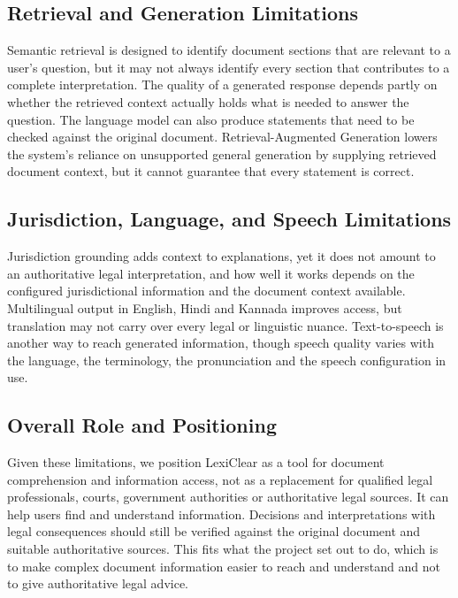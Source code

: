 \documentclass[12pt,a4paper,oneside]{report}
\begin{document}
\subsection{Retrieval and Generation Limitations}

Semantic retrieval is designed to identify document sections that are
relevant to a user's question, but it may not always identify every section
that contributes to a complete interpretation. The quality of a generated response depends partly on whether the retrieved context actually holds what is needed to answer the question. The language model can also produce statements that need to be checked against the original document. Retrieval-Augmented Generation lowers the system's reliance on unsupported general generation by supplying retrieved document context, but it cannot guarantee that every statement is correct.

\subsection{Jurisdiction, Language, and Speech Limitations}

Jurisdiction grounding adds context to explanations, yet it does not amount to an authoritative legal interpretation, and how well it works depends on the configured jurisdictional information and the document context available. Multilingual output in English, Hindi and Kannada improves access, but translation may not carry over every legal or linguistic nuance. Text-to-speech is another way to reach generated information, though speech quality varies with the language, the terminology, the pronunciation and the speech configuration in use.

\subsection{Overall Role and Positioning}

Given these limitations, we position LexiClear as a tool for document comprehension and information access, not as a replacement for qualified legal professionals, courts, government authorities or authoritative legal sources. It can help users find and understand information. Decisions and interpretations with legal consequences should still be verified against the original document and suitable authoritative sources. This fits what the project set out to do, which is to make complex document information easier to reach and understand and not to give authoritative legal advice.
\end{document}
